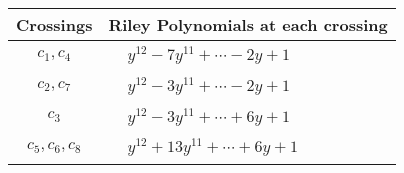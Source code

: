 \documentclass[1p]{elsarticle_modified}
\theoremstyle{definition}
\begin{document}
\begin{tabular}{m{50pt}|m{274pt}}
Crossings & \hspace{64pt}Riley Polynomials at each crossing \\
\hline $$\begin{aligned}c_{1},c_{4}\end{aligned}$$&$\begin{aligned}
&y^{12}-7 y^{11}+\cdots-2 y+1
\end{aligned}$\\
\hline $$\begin{aligned}c_{2},c_{7}\end{aligned}$$&$\begin{aligned}
&y^{12}-3 y^{11}+\cdots-2 y+1
\end{aligned}$\\
\hline $$\begin{aligned}c_{3}\end{aligned}$$&$\begin{aligned}
&y^{12}-3 y^{11}+\cdots+6 y+1
\end{aligned}$\\
\hline $$\begin{aligned}c_{5},c_{6},c_{8}\end{aligned}$$&$\begin{aligned}
&y^{12}+13 y^{11}+\cdots+6 y+1
\end{aligned}$\\
\hline
\end{tabular}
\vskip 2pc
\end{document}
